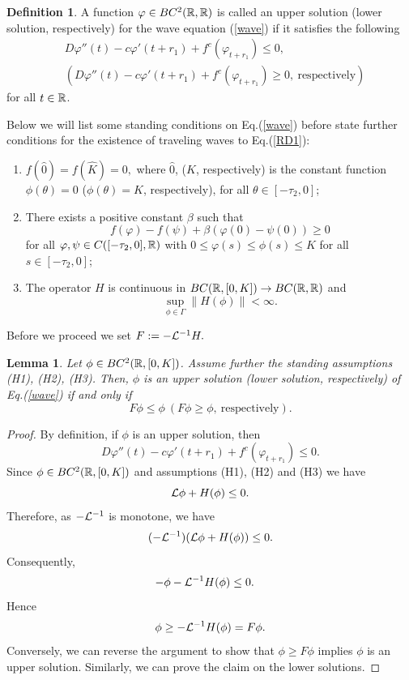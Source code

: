 \documentclass[12pt,letterpaper]{amsart}
\newtheorem{lemma}[theorem]{Lemma}
\theoremstyle{definition}
\newtheorem{definition}[theorem]{Definition}
\theoremstyle{remark}
\numberwithin{equation}{section}
\begin{document}
\begin{definition} A function $\varphi \in BC^2(\R,\R)$ is called an upper solution (lower solution, respectively) for the wave equation (\ref{wave}) if it satisfies the following
\begin{align*}
& D\varphi''(t)-c\varphi'(t+r_1)+f^c(\varphi_{t+r_1})\le 0 , \\
& (D\varphi''(t)-c\varphi'(t+r_1)+f^c(\varphi_{t+r_1})\ge 0, \ \mbox{respectively})
\end{align*}
for all $t\in\R$.
\end{definition}

Below we will list some standing conditions on Eq.(\ref{wave}) before state further conditions for the existence of traveling waves to Eq.(\ref{RD1}):
\begin{enumerate}
\item[(H1)] $f(\hat 0) =f(\hat K)=0,$ where $\hat 0$, ($\hat K$, respectively) is the constant function $\phi (\theta) =0$ ($\phi (\theta )=K$, respectively), for all $\theta \in [-\tau_2,0]$;
\item[(H2)] There exists a positive constant $\beta$ such that
$$
f(\varphi)-f(\psi ) +\beta (\varphi(0)-\psi (0)) \ge 0
$$
for all $\varphi, \psi \in C([-\tau_2,0],\R)$ with $0\le \varphi (s)\le \phi (s)\le K$ for all $s\in [-\tau_2,0]$;
\item[(H3)] The operator $H$ is continuous in $BC(\R, [0,K])\to BC(\R,\R)$ and
$$
\sup_{\phi\in\Gamma} \| H(\phi)\| <\infty .
$$
\end{enumerate}
Before we proceed we set $F:=-{\cal L}^{-1}H.$
\begin{lemma}\label{lem 5.4}
Let $\phi \in BC^2(\R, [0,K])$. Assume further the standing assumptions (H1), (H2), (H3). Then,  $\phi$ is an upper solution (lower solution, respectively) of Eq.(\ref{wave}) if and only if
$$
F\phi \le \phi   \ (F\phi \ge \phi , \ \mbox{respectively}) .
$$
\end{lemma}
\begin{proof}
By definition, if $\phi$ is an upper solution, then
$$
 D\varphi''(t)-c\varphi'(t+r_1)+f^c(\varphi_{t+r_1})\le 0 .
$$
Since $\phi\in BC^2(\R,[0,K])$ and assumptions (H1), (H2) and (H3) we have
$$
{\cal L}\phi +H(\phi ) \le 0 .
$$
Therefore, as $-{\cal L}^{-1} $ is monotone, we have
$$
(-{\cal L}^{-1} )({\cal L}\phi  + H(\phi ) )\le 0.
$$
Consequently,
\begin{align}
-\phi -{\cal L}^{-1} H(\phi ) &\le 0.
\end{align}
Hence
$$
\phi \ge -{\cal L}^{-1} H(\phi )=F\phi .
$$
Conversely, we can reverse the argument to show that $\phi \ge F\phi$ implies $\phi$ is an upper solution. Similarly, we can prove the claim on the lower solutions.
\end{proof}
\end{document}
